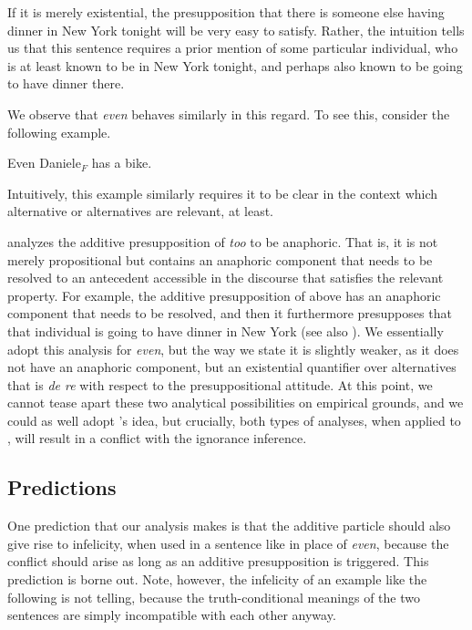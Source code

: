 \documentclass[output=paper]{langscibook}
\begin{document}
\noindent If it is merely existential, the presupposition that there is someone else having dinner in New York tonight will be very easy to satisfy. Rather, the intuition tells us that this sentence requires a prior mention of some particular individual, who is at least known to be in New York tonight, and perhaps also known to be going to have dinner there.

We observe that \textit{even} behaves similarly in this regard. To see this, consider the following example.

     \ea Even Daniele$_F$ has a bike.\z

\noindent Intuitively, this example similarly requires it to be clear in the context which alternative or alternatives are relevant, at least.

\citet{kripke} analyzes the additive presupposition of \textit{too} to be anaphoric. That is, it is not merely propositional but contains an anaphoric component that needs to be resolved to an antecedent accessible in the discourse that satisfies the relevant property. For example, the additive presupposition of  above has an anaphoric component that needs to be resolved, and then it furthermore presupposes that that individual is going to have dinner in New York (see also \citealt{geurtsvandersandt}). We essentially adopt this analysis for \textit{even}, but the way we state it is slightly weaker, as it does not have an anaphoric component, but an existential quantifier over alternatives that is \textit{de re} with respect to the presuppositional attitude. At this point, we cannot tease apart these two analytical possibilities on empirical grounds, and we could as well adopt \citeauthor{kripke}'s idea, but crucially, both types of analyses, when applied to , will result in a conflict with the ignorance inference.


\subsection{Predictions}

One prediction that our analysis makes is that the additive particle should also give rise to infelicity, when used in a sentence like  in place of \textit{even}, because the conflict should arise as long as an additive presupposition is triggered. This prediction is borne out. Note, however, the infelicity of an example like the following is not telling, because the truth-conditional meanings of the two sentences are simply incompatible with each other anyway.
\end{document}
